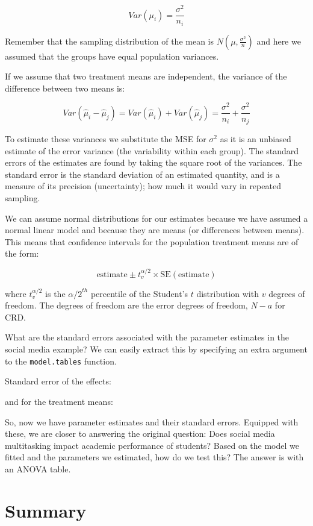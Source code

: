\documentclass[
  letterpaper,
]{book}
\begin{document}
\[Var(\mu_i) = \frac{\sigma^2}{n_i} \]

Remember that the sampling distribution of the mean is
\(N(\mu,\frac{\sigma^2}{n})\) and here we assumed that the groups have
equal population variances.

If we assume that two treatment means are independent, the variance of
the difference between two means is:

\[
Var(\hat{\mu}_i - \hat{\mu}_j) = Var(\hat{\mu}_i) + Var(\hat{\mu}_j) = \frac{\sigma^2}{n_i} + \frac{\sigma^2}{n_j}
\]

To estimate these variances we substitute the MSE for \(\sigma^2\) as it
is an unbiased estimate of the error variance (the variability within
each group). The standard errors of the estimates are found by taking
the square root of the variances. The standard error is the standard
deviation of an estimated quantity, and is a measure of its precision
(uncertainty); how much it would vary in repeated sampling.

We can assume normal distributions for our estimates because we have
assumed a normal linear model and because they are means (or differences
between means). This means that confidence intervals for the population
treatment means are of the form:

\[ \text{estimate} \pm t^{\alpha/2}_v \times \text{SE}(\text{estimate})\]

where \(t^{\alpha/2}_v\) is the \({\alpha/2}^{th}\) percentile of the
Student's \(t\) distribution with \(v\) degrees of freedom. The degrees
of freedom are the error degrees of freedom, \(N-a\) for CRD.

What are the standard errors associated with the parameter estimates in
the social media example? We can easily extract this by specifying an
extra argument to the \texttt{model.tables} function.

Standard error of the effects:

and for the treatment means:

So, now we have parameter estimates and their standard errors. Equipped
with these, we are closer to answering the original question: Does
social media multitasking impact academic performance of students? Based
on the model we fitted and the parameters we estimated, how do we test
this? The answer is with an ANOVA table.

\section{Summary}\label{summary-1}
\end{document}
